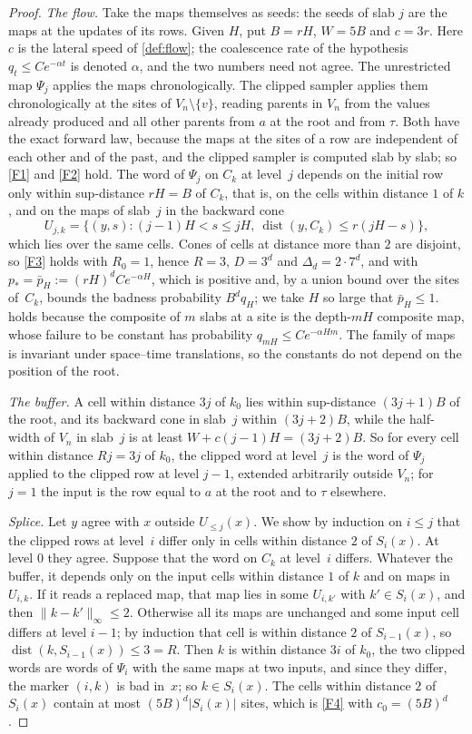 \documentclass[11pt]{article}
\theoremstyle{plain}
\theoremstyle{definition}
\theoremstyle{remark}
\newcommand{\dist}{\operatorname{dist}}
\begin{document}
\begin{proof}
\emph{The flow.} Take the maps themselves as seeds: the seeds of slab $j$ are the maps at the updates of its rows. Given $H$, put $B=rH$, $W=5B$ and $c=3r$. Here $c$ is the lateral speed of \cref{def:flow}; the coalescence rate of the hypothesis $q_t\le Ce^{-\alpha t}$ is denoted $\alpha$, and the two numbers need not agree. The unrestricted map $\Psi_j$ applies the maps chronologically. The clipped sampler applies them chronologically at the sites of $V_n\setminus\{v\}$, reading parents in $V_n$ from the values already produced and all other parents from $a$ at the root and from $\tau$. Both have the exact forward law, because the maps at the sites of a row are independent of each other and of the past, and the clipped sampler is computed slab by slab; so \ref{F1} and \ref{F2} hold. The word of $\Psi_j$ on $C_k$ at level~$j$ depends on the initial row only within sup-distance $rH=B$ of $C_k$, that is, on the cells within distance $1$ of $k$, and on the maps of slab~$j$ in the backward cone
\[
U_{j,k}=\bigl\{(y,s):(j-1)H<s\le jH,\ \dist(y,C_k)\le r(jH-s)\bigr\},
\]
which lies over the same cells. Cones of cells at distance more than $2$ are disjoint, so \ref{F3} holds with $R_0=1$, hence $R=3$, $D=3^d$ and $\Delta_d=2\cdot7^d$, and with $p_*=\bar p_H:=(rH)^dCe^{-\alpha H}$, which is positive and, by a union bound over the sites of~$C_k$, bounds the badness probability $B^dq_H$; we take $H$ so large that $\bar p_H\le1$.  holds because the composite of $m$ slabs at a site is the depth-$mH$ composite map, whose failure to be constant has probability $q_{mH}\le Ce^{-\alpha Hm}$. The family of maps is invariant under space--time translations, so the constants do not depend on the position of the root.

\emph{The buffer.} A cell within distance $3j$ of $k_0$ lies within sup-distance $(3j+1)B$ of the root, and its backward cone in slab~$j$ within $(3j+2)B$, while the half-width of $V_n$ in slab~$j$ is at least $W+c(j-1)H=(3j+2)B$. So for every cell within distance $Rj=3j$ of $k_0$, the clipped word at level~$j$ is the word of $\Psi_j$ applied to the clipped row at level $j-1$, extended arbitrarily outside $V_n$; for $j=1$ the input is the row equal to $a$ at the root and to $\tau$ elsewhere.

\emph{Splice.} Let $y$ agree with $x$ outside $U_{\le j}(x)$. We show by induction on $i\le j$ that the clipped rows at level~$i$ differ only in cells within distance $2$ of $S_i(x)$. At level $0$ they agree. Suppose that the word on $C_k$ at level~$i$ differs. Whatever the buffer, it depends only on the input cells within distance $1$ of $k$ and on maps in $U_{i,k}$. If it reads a replaced map, that map lies in some $U_{i,k'}$ with $k'\in S_i(x)$, and then $\|k-k'\|_\infty\le2$. Otherwise all its maps are unchanged and some input cell differs at level $i-1$; by induction that cell is within distance $2$ of $S_{i-1}(x)$, so $\dist(k,S_{i-1}(x))\le3=R$. Then $k$ is within distance $3i$ of $k_0$, the two clipped words are words of $\Psi_i$ with the same maps at two inputs, and since they differ, the marker $(i,k)$ is bad in~$x$; so $k\in S_i(x)$. The cells within distance $2$ of $S_i(x)$ contain at most $(5B)^d|S_i(x)|$ sites, which is \ref{F4} with $c_0=(5B)^d$.


\end{proof}
\end{document}
